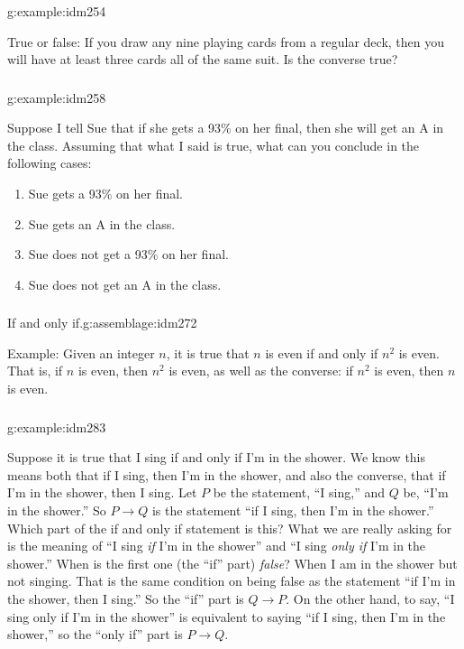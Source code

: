 \documentclass[11pt, compress]{beamer}
\newcommand{\imp}{\rightarrow}
\begin{document}
\begin{frame}
\frametitle{}
\begin{example}{}{g:example:idm254}%

True or false: If you draw any nine playing cards from a regular deck, then you will have at least three cards all of the same suit. Is the converse true?\end{example}
\end{frame}
 
\begin{frame}
\frametitle{}
\begin{example}{}{g:example:idm258}%

Suppose I tell Sue that if she gets a 93\% on her final, then she will get an A in the class. Assuming that what I said is true, what can you conclude in the following cases:
\begin{enumerate}
\item{}
Sue gets a 93\% on her final.

\item{}
Sue gets an A in the class.

\item{}
Sue does not get a 93\% on her final.

\item{}
Sue does not get an A in the class.
\end{enumerate}\end{example}
\end{frame}
 
\begin{frame}
\frametitle{}
\begin{assemblage}{If and only if.}{g:assemblage:idm272}%

Example: Given an integer \(n\), it is true that \(n\) is even if and only if \(n^2\) is even. That is, if \(n\) is even, then \(n^2\) is even, as well as the converse: if \(n^2\) is even, then \(n\) is even.\end{assemblage}
\end{frame}
 
\begin{frame}
\frametitle{}
\begin{example}{}{g:example:idm283}%

Suppose it is true that I sing if and only if I'm in the shower. We know this means both that if I sing, then I'm in the shower, and also the converse, that if I'm in the shower, then I sing. Let \(P\) be the statement, ``I sing,'' and \(Q\) be, ``I'm in the shower.'' So \(P \imp Q\) is the statement ``if I sing, then I'm in the shower.'' Which part of the if and only if statement is this?
What we are really asking for is the meaning of ``I sing \emph{if} I'm in the shower'' and ``I sing \emph{only if} I'm in the shower.'' When is the first one (the ``if'' part) \emph{false}? When I am in the shower but not singing. That is the same condition on being false as the statement ``if I'm in the shower, then I sing.'' So the ``if'' part is \(Q \imp P\). On the other hand, to say, ``I sing only if I'm in the shower'' is equivalent to saying ``if I sing, then I'm in the shower,'' so the ``only if'' part is \(P \imp Q\).\end{example}
\end{frame}
 
\end{document}
